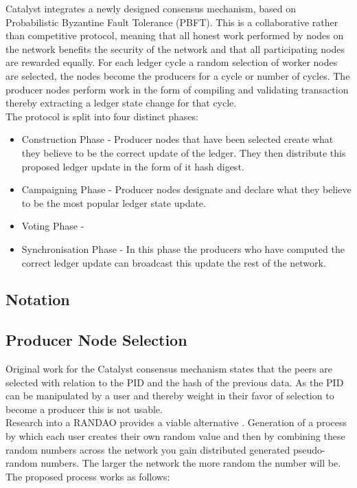 \documentclass{article}
\begin{document}
Catalyst integrates a newly designed consensus mechanism, based on Probabilistic Byzantine Fault Tolerance (PBFT).  This is a collaborative rather than competitive protocol, meaning that all honest work performed by nodes on the network benefits the security of the network and that all participating nodes are rewarded equally. For each ledger cycle a random selection of worker nodes are selected, the nodes become the producers for a cycle or number of cycles. The producer nodes perform work in the form of compiling and validating transaction thereby extracting a ledger state change for that cycle. \\

The protocol is split into four distinct phases:

\begin{itemize}

\item Construction Phase - Producer nodes that have been selected create what they believe to be the correct update of the ledger. They then distribute this proposed ledger update in the form of it hash digest.
\item Campaigning Phase - Producer nodes designate and declare what they believe to be the most popular ledger state update. 
\item Voting Phase - 	
\item Synchronisation Phase - In this phase the producers who have computed the correct ledger update can broadcast this update the rest of the network. 

\end{itemize} 

\subsection{Notation} 

\subsection{Producer Node Selection} 



Original work for the Catalyst consensus mechanism states that the peers are selected with relation to the PID and the hash of the previous data. As the PID can be manipulated by a user and thereby weight in their favor of selection to become a producer this is not usable. \\

Research into a RANDAO provides a viable alternative \cite{skvorc}\cite{randao}. Generation of a process by which each user creates their own random value and then by combining these random numbers across the network you gain distributed generated pseudo-random numbers. The larger the network the more random the number will be. The proposed process works as follows: \\
\end{document}
